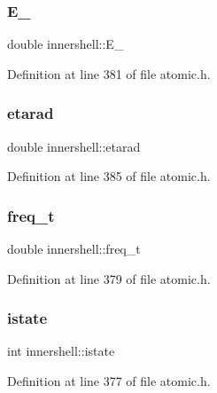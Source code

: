 \subsubsection{\texorpdfstring{E\+\_}{E\_0}}
{\footnotesize\ttfamily double innershell\+::\+E\+\_}



Definition at line 381 of file atomic.\+h.

\mbox{\label{structinnershell_aabedc3071b0ed17c9155d4ad7709eae5}} 
\subsubsection{\texorpdfstring{etarad}{etarad}}
{\footnotesize\ttfamily double innershell\+::etarad}



Definition at line 385 of file atomic.\+h.

\mbox{\label{structinnershell_ae824e960b3de652b9906b282f4ea2400}} 
\subsubsection{\texorpdfstring{freq\+\_\+t}{freq\_t}}
{\footnotesize\ttfamily double innershell\+::freq\+\_\+t}



Definition at line 379 of file atomic.\+h.

\mbox{\label{structinnershell_a13aff941c3a029b012f90e0a377c939c}} 
\subsubsection{\texorpdfstring{istate}{istate}}
{\footnotesize\ttfamily int innershell\+::istate}



Definition at line 377 of file atomic.\+h.

\mbox{\label{structinnershell_a17cd64eb9054ee44728107617f5e928c}} 
